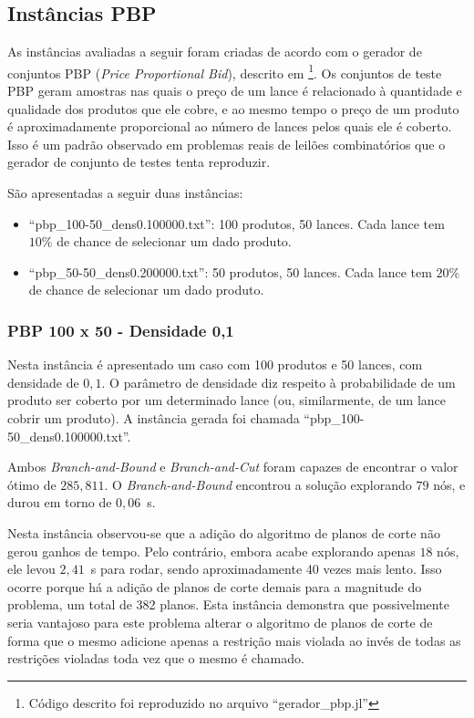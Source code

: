 \documentclass{article}
\begin{document}
    
    
    \subsection{Instâncias PBP}
    
    As instâncias avaliadas a seguir foram criadas de acordo com o gerador de conjuntos PBP (\emph{Price Proportional Bid}), descrito em \cite{guo2005using}\footnote{
    Código descrito foi reproduzido no arquivo \enquote{gerador\_pbp.jl}}.
    Os conjuntos de teste PBP geram amostras nas quais o preço de um lance é relacionado à quantidade e qualidade dos produtos que ele cobre, e ao mesmo tempo o preço de um produto é aproximadamente proporcional ao número de lances pelos quais ele é coberto. Isso é um padrão observado em problemas reais de leilões combinatórios que o gerador de conjunto de testes tenta reproduzir.
    
    São apresentadas a seguir duas instâncias:
    \begin{itemize}
        \item \enquote{pbp\_100-50\_dens0.100000.txt}: 100 produtos, 50 lances. Cada lance tem $10\%$ de chance de selecionar um dado produto.
        \item \enquote{pbp\_50-50\_dens0.200000.txt}: 50 produtos, 50 lances. Cada lance tem $20\%$ de chance de selecionar um dado produto.
    \end{itemize}
    
    \subsubsection{PBP 100 x 50 - Densidade 0,1}
    
    Nesta instância é apresentado um caso com 100 produtos e 50 lances, com densidade de $0{,}1$. O parâmetro de densidade diz respeito à probabilidade de um produto ser coberto por um determinado lance (ou, similarmente, de um lance cobrir um produto). A instância gerada foi chamada \enquote{pbp\_100-50\_dens0.100000.txt}.
    
    Ambos \emph{Branch-and-Bound} e \emph{Branch-and-Cut} foram capazes de encontrar o valor ótimo de $285{,}811$. O \emph{Branch-and-Bound} encontrou a solução explorando $79$ nós, e durou em torno de $0{,}06$~s. 
    
    Nesta instância observou-se que a adição do algoritmo de planos de corte não gerou ganhos de tempo. Pelo contrário, embora acabe explorando apenas $18$ nós, ele levou $2{,}41$~s para rodar, sendo aproximadamente 40 vezes mais lento. Isso ocorre porque há a adição de planos de corte demais para a magnitude do problema, um total de 382 planos. Esta instância demonstra que possivelmente seria vantajoso para este problema alterar o algoritmo de planos de corte de forma que o mesmo adicione apenas a restrição mais violada ao invés de todas as restrições violadas toda vez que o mesmo é chamado.
    
\end{document}
